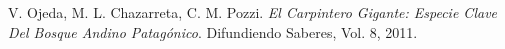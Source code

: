 %

%

\begin{thebibliography}{9}
V. Ojeda, M. L. Chazarreta, C. M. Pozzi. \textit{El Carpintero Gigante: Especie Clave Del Bosque Andino Patagónico}. Difundiendo Saberes, Vol. 8, 2011.

\end{thebibliography}

%
